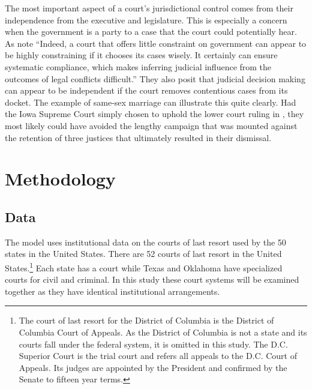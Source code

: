 \documentclass[12pt]{article}
\begin{document}
The most important aspect of a court's jurisdictional control comes from their independence from the executive and legislature.  This is especially a concern when the government is a party to a case that the court could potentially hear.  As \citet[6]{Rios2014} note ``Indeed, a court that offers little constraint on government can appear to be highly constraining if it chooses its cases wisely. It certainly can ensure systematic compliance, which makes inferring judicial influence from the outcomes of legal conflicts difficult.''  They also posit that judicial decision making can appear to be independent if the court removes contentious cases from its docket.  The example of same-sex marriage can illustrate this quite clearly.  Had the Iowa Supreme Court simply chosen to uphold the lower court ruling in \cite{iowagay}, they most likely could have avoided the lengthy campaign that was mounted against the retention of three justices that ultimately resulted in their dismissal.


\section*{Methodology}
\subsection*{Data}
The model uses institutional data on the courts of last resort used by the 50 states in the United States.  There are 52 courts of last resort in the United States.\footnote{The court of last resort for the District of Columbia is the District of Columbia Court of Appeals.  As the District of Columbia is not a state and its courts fall under the federal system, it is omitted in this study.  The D.C. Superior Court is the trial court and refers all appeals to the D.C. Court of Appeals.  Its judges are appointed by the President and confirmed by the Senate to fifteen year terms.}  Each state has a court while Texas and Oklahoma have specialized courts for civil and criminal.  In this study these court systems will be examined together as they have identical institutional arrangements.  
\end{document}
